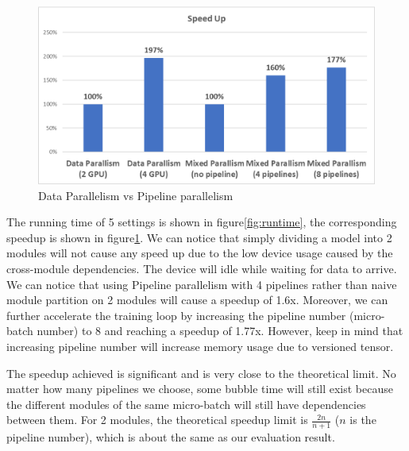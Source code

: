 \documentclass[sigplan, nonacm]{acmart}\settopmatter{printfolios=true,printccs=false,printacmref=false}
\begin{document}
\begin{figure}[htbp]
  \centering
  \includegraphics[scale=0.5]{pipelineparallelspeedup.png}
  \caption{Data Parallelism vs Pipeline parallelism}
  \label{fig:speedup}
\end{figure}
 The running time of 5 settings is shown in figure\ref{fig:runtime}, the corresponding speedup is shown in figure\ref{fig:speedup}. We can notice that simply dividing a model into 2 modules will not cause any speed up due to the low device usage caused by the cross-module dependencies. The device will idle while waiting for data to arrive. We can notice that using Pipeline parallelism with 4 pipelines rather than naive module partition on 2 modules will cause a speedup of 1.6x. Moreover, we can further accelerate the training loop by increasing the pipeline number (micro-batch number) to 8 and reaching a speedup of 1.77x. However, keep in mind that increasing pipeline number will increase memory usage due to versioned tensor.\par
 The speedup achieved is significant and is very close to the theoretical limit. No matter how many pipelines we choose, some bubble time will still exist because the different modules of the same micro-batch will still have dependencies between them. For 2 modules, the theoretical speedup limit is $\frac{2n}{n+1}$ ($n$ is the pipeline number), which is about the same as our evaluation result.\par
\end{document}
